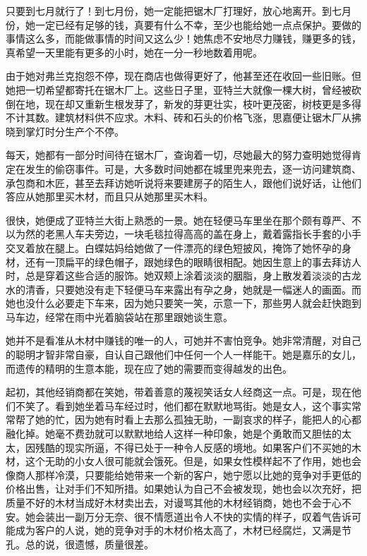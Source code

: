 \par 只要到七月就行了！到七月份，她一定能把锯木厂打理好，放心地离开。到七月份，她一定已经有足够的钱，真要有什么不幸，至少也能给她一点点保护。要做的事情这么多，而能做事情的时间又这么少！她焦虑不安地尽力赚钱，赚更多的钱，真希望一天里能有更多的小时，她在一分一秒地数着用呢。
\par 由于她对弗兰克抱怨不停，现在商店也做得更好了，他甚至还在收回一些旧账。但她把一切希望都寄托在锯木厂上。这些日子里，亚特兰大就像一棵大树，曾经被砍倒在地，现在却又重新生根发芽了，新发的芽更壮实，枝叶更茂密，树枝更是多得不计其数。建筑材料供不应求。木料、砖和石头的价格飞涨，思嘉便让锯木厂从拂晓到掌灯时分生产个不停。
\par 每天，她都有一部分时间待在锯木厂，查询着一切，尽她最大的努力查明她觉得肯定在发生的偷窃事件。可是，大多数时间她都在城里兜来兜去，逐一访问建筑商、承包商和木匠，甚至去拜访她听说将来要建房子的陌生人，跟他们说好话，让他们答应从她那里买木材，而且只从她那里买木料。
\par 很快，她便成了亚特兰大街上熟悉的一景。她在轻便马车里坐在那个颇有尊严、不以为然的老黑人车夫旁边，一块毛毯拉得高高的盖在身上，戴着露指长手套的小手交叉着放在腿上。白蝶姑妈给她做了一件漂亮的绿色短披风，掩饰了她怀孕的身材，还有一顶扁平的绿色帽子，跟她绿色的眼睛很相配。她因生意上的事去拜访人时，总是穿着这些合适的服饰。她双颊上涂着淡淡的胭脂，身上散发着淡淡的古龙水的清香，只要她没有走下轻便马车来露出有孕之身，她就是一幅迷人的画面。而她也没什么必要走下车来，因为她只要笑一笑，示意一下，那些男人就会赶快跑到马车边，经常在雨中光着脑袋站在那里跟她谈生意。
\par 她并不是看准从木材中赚钱的唯一的人，可她并不害怕竞争。她非常清醒，对自己的聪明才智非常自豪，自认自己跟他们中任何一个人一样能干。她是嘉乐的女儿，而遗传的精明的生意本能，现在应了她的需要而变得越发的出色。
\par 起初，其他经销商都在笑她，带着善意的蔑视笑话女人经商这一点。可是，现在他们不笑了。看到她坐着马车经过时，他们都在默默地骂街。她是女人，这个事实常常帮了她的忙，因为她有时看上去那么孤独无助，一副哀求的样子，能把人的心都融化掉。她毫不费劲就可以默默地给人这样一种印象，她是个勇敢而又胆怯的太太，因残酷的现实所逼，不得已处于一种令人反感的境地。如果客户们不买她的木材，这个无助的小女人很可能就会饿死。但是，如果女性模样起不了作用，她也会像商人那样冷漠，只要能给她带来一个新的客户，她宁愿以比她的竞争对手更低的价格出售，让对手们不知所措。如果她认为自己不会被发现，她也会以次充好，把质量不好的木材当成好木材卖出去，对谩骂其他的木材经销商，她也不会于心不安。她会装出一副万分无奈、很不情愿道出令人不快的实情的样子，叹着气告诉可能成为客户的人说，她的竞争对手的木材价格太高了，木材已经腐烂，又满是节孔。总的说，很遗憾，质量很差。
